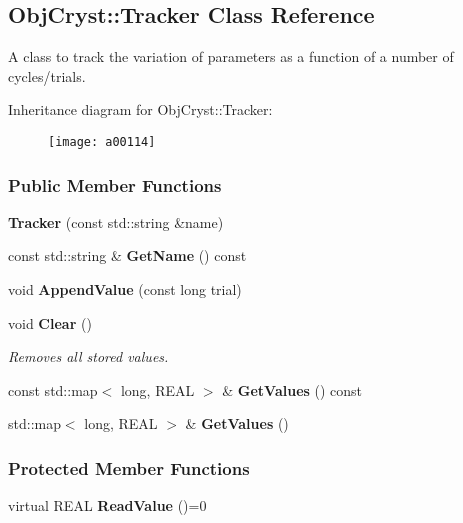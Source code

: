 \subsection{Obj\-Cryst\-:\-:Tracker Class Reference}
\label{a00114}


A class to track the variation of parameters as a function of a number of cycles/trials.  


Inheritance diagram for Obj\-Cryst\-:\-:Tracker\-:\begin{figure}[H]
\begin{center}
\leavevmode
\texttt{[image: a00114]}
\end{center}
\end{figure}
\subsubsection*{Public Member Functions}
\begin{DoxyCompactItemize}
\item 
{\bfseries Tracker} (const std\-::string \&name)\label{a00114_a57d89249ba910902e6ef6a33dcd3ee8c}

\item 
const std\-::string \& {\bfseries Get\-Name} () const \label{a00114_ad93197775f7d0a3b52eb199a9ed1c958}

\item 
void {\bfseries Append\-Value} (const long trial)\label{a00114_ae50d08700a131d280f8a19a58274bfe7}

\item 
void {\bf Clear} ()\label{a00114_abdac1cff42cfd8d66e10977a5a9066b3}

\begin{DoxyCompactList}\small\item\em Removes all stored values. \end{DoxyCompactList}\item 
const std\-::map$<$ long, R\-E\-A\-L $>$ \& {\bfseries Get\-Values} () const \label{a00114_a882fe8d7c193662613d4a9ab262a2417}

\item 
std\-::map$<$ long, R\-E\-A\-L $>$ \& {\bfseries Get\-Values} ()\label{a00114_a4f889b0d29a403c597040c5b88f4ffa8}

\end{DoxyCompactItemize}
\subsubsection*{Protected Member Functions}
\begin{DoxyCompactItemize}
\item 
virtual R\-E\-A\-L {\bfseries Read\-Value} ()=0\label{a00114_a14096d99b76d3ffac16553f6434f97ce}

\end{DoxyCompactItemize}
